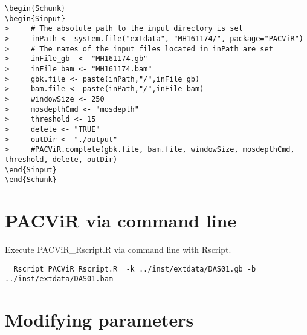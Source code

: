 \documentclass[letterpaper]{article}
\begin{document}
  \begin{footnotesize}
  \begin{lstlisting}[linerange=\\begin\{Sinput\}-\\end\{Sinput\},includerangemarker=false]
\begin{Schunk}
\begin{Sinput}
>     # The absolute path to the input directory is set
>     inPath <- system.file("extdata", "MH161174/", package="PACViR")
>     # The names of the input files located in inPath are set
>     inFile_gb  <- "MH161174.gb"
>     inFile_bam <- "MH161174.bam"
>     gbk.file <- paste(inPath,"/",inFile_gb)
>     bam.file <- paste(inPath,"/",inFile_bam)
>     windowSize <- 250
>     mosdepthCmd <- "mosdepth"
>     threshold <- 15 
>     delete <- "TRUE"
>     outDir <- "./output"
>     #PACViR.complete(gbk.file, bam.file, windowSize, mosdepthCmd, threshold, delete, outDir)
\end{Sinput}
\end{Schunk}
  \end{lstlisting}
  \end{footnotesize}
  


\section{PACViR via command line}

  Execute PACViR\_Rscript.R via command line with Rscript.
  
\begin{footnotesize}
\begin{lstlisting}
  Rscript PACViR_Rscript.R  -k ../inst/extdata/DAS01.gb -b ../inst/extdata/DAS01.bam 
\end{lstlisting}
\end{footnotesize}

  
\section{Modifying parameters}
\end{document}
